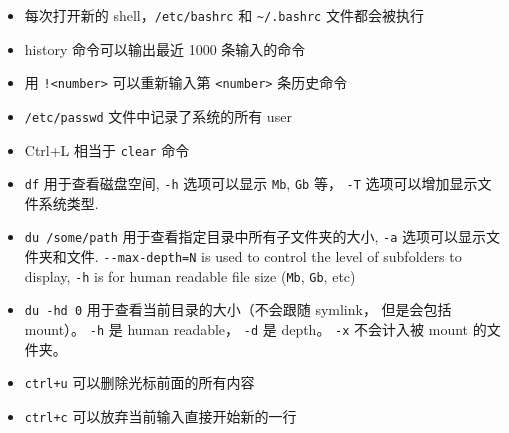 \begin{itemize}
\item 每次打开新的 shell，\verb`/etc/bashrc` 和 \verb`~/.bashrc` 文件都会被执行
\item history 命令可以输出最近 1000 条输入的命令
\item 用 \verb`!<number>` 可以重新输入第 \verb`<number>` 条历史命令
\item \verb`/etc/passwd` 文件中记录了系统的所有 user
\item Ctrl+L 相当于 \verb`clear` 命令
\item \verb`df` 用于查看磁盘空间, \verb`-h` 选项可以显示 \verb`Mb`, \verb`Gb` 等， \verb|-T| 选项可以增加显示文件系统类型.
\item \verb`du /some/path` 用于查看指定目录中所有子文件夹的大小, \verb`-a` 选项可以显示文件夹和文件. \verb`--max-depth=N` is used to control the level of subfolders to display, \verb`-h` is for human readable file size (\verb`Mb`, \verb`Gb`, etc)
\item \verb|du -hd 0| 用于查看当前目录的大小（不会跟随 symlink， 但是会包括 mount）。 \verb|-h| 是 human readable， \verb|-d| 是 depth。 \verb|-x| 不会计入被 mount 的文件夹。
\item \verb`ctrl+u` 可以删除光标前面的所有内容
\item \verb`ctrl+c` 可以放弃当前输入直接开始新的一行
\end{itemize}


